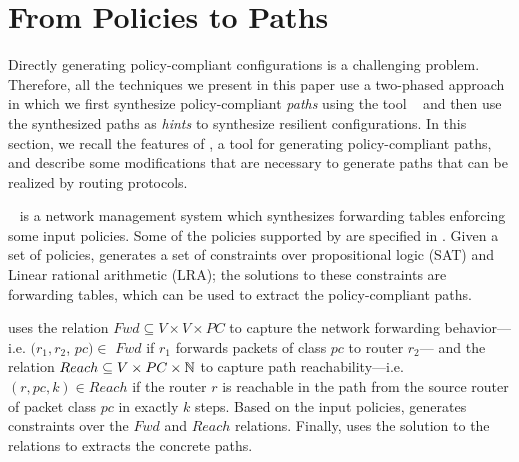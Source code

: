 \section{From Policies to Paths} \label{sec:architecture}
Directly generating policy-compliant configurations is a challenging
problem.
Therefore, all the techniques we present in this paper 
use a two-phased approach in which we first synthesize
policy-compliant \emph{paths} using the tool \genesis~\cite{genesis}
and then use the synthesized paths as \emph{hints} to synthesize resilient configurations. 
In this section, we recall the features of \genesis,
 a tool for generating policy-compliant paths, and describe
some modifications that are necessary to generate paths that
can be realized by routing protocols. 


\genesis~\cite{genesis} is a network management
system which synthesizes forwarding tables enforcing some input policies. 
Some of the policies supported by \genesis are specified in 
. 
Given a set of policies, \genesis generates a set of constraints 
over propositional logic (SAT) and Linear rational arithmetic (LRA);
the solutions to these constraints are forwarding
tables, which can be used to extract the 
policy-compliant paths.

\genesis uses the relation $Fwd \subseteq V \times V \times PC $  
to capture 
the network forwarding behavior---i.e. 
$(r_1, r_2$, $pc)\in$ $Fwd$ if 
$r_1$ forwards packets of class $pc$ to router $r_2$---
and 
the relation $Reach \subseteq V \times PC \times \mathbb{N}$ 
to capture
 path reachability---i.e. $(r, pc, k)\in Reach$ if 
the router $r$ is reachable in the path from the source
router of packet class $pc$ in exactly $k$ steps. Based on
the input policies, \genesis generates constraints over the $Fwd$
and $Reach$ relations. Finally, \genesis uses the solution to the relations to extracts the concrete paths.

